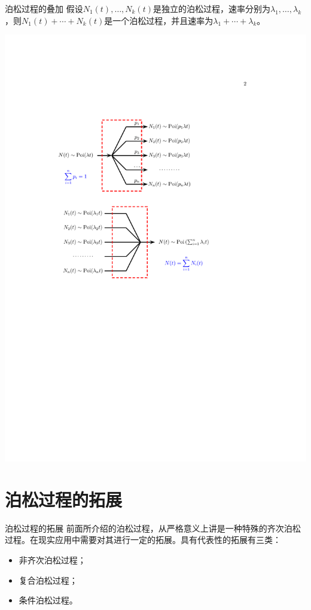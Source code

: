 \documentclass[t]{beamer}
\begin{document}
\begin{frame}{泊松过程的叠加}
假设$N_1(t),\ldots, N_k(t)$是独立的泊松过程，速率分别为$\lambda_1,\ldots,\lambda_k$，则$N_1(t)+\cdots+N_k(t)$是一个泊松过程，并且速率为$\lambda_1+\cdots+\lambda_k$。
\begin{center}
    \includegraphics[scale=0.85]{fig/poisson3.pdf}
\end{center}
\end{frame}

\section{泊松过程的拓展}
\begin{frame}{泊松过程的拓展}
    前面所介绍的泊松过程，从严格意义上讲是一种特殊的齐次泊松过程。在现实应用中需要对其进行一定的拓展。具有代表性的拓展有三类：
    \begin{itemize}
        \item     非齐次泊松过程；
        \item     复合泊松过程；
        \item 条件泊松过程。
    \end{itemize}

\end{frame}
\end{document}
